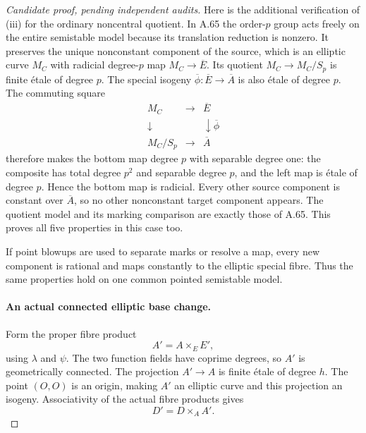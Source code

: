 \begin{proof}[Candidate proof, pending independent audits]
Here is the additional verification of (iii) for the
ordinary noncentral quotient. In A.65 the order-\(p\)
group acts freely on the entire semistable model because
its translation reduction is nonzero. It preserves the
unique nonconstant component of the source, which is an
elliptic curve \(M_C\) with radicial degree-\(p\) map
\(M_C\to\overline E\). Its quotient
\(M_C\to M_C/S_p\) is finite étale of degree \(p\).
The special isogeny
\(\overline\phi:\overline E\to\overline A\) is also
étale of degree \(p\). The commuting square
\[
 \begin{array}{ccc}
 M_C&\longrightarrow&\overline E\\
 \downarrow&&\downarrow\overline\phi\\
 M_C/S_p&\longrightarrow&\overline A
 \end{array}
                                                               \tag{A.66.6}
\]
therefore makes the bottom map degree \(p\) with separable
degree one: the composite has total degree \(p^2\) and
separable degree \(p\), and the left map is étale of degree
\(p\). Hence the bottom map is radicial. Every other source
component is constant over \(\overline A\), so no other
nonconstant target component appears. The quotient model
and its marking comparison are exactly those of A.65.
This proves all five properties in this case too.

If point blowups are used to separate marks or resolve a
map, every new component is rational and maps constantly
to the elliptic special fibre. Thus the same properties
hold on one common pointed semistable model.

\paragraph{An actual connected elliptic base change.}
Form the proper fibre product
\[
                         A'=A\times_E E',
                                                               \tag{A.66.7}
\]
using \(\lambda\) and \(\psi\). The two function fields
have coprime degrees, so \(A'\) is geometrically connected.
The projection \(A'\to A\) is finite étale of degree \(h\).
The point \((O,O)\) is an origin, making \(A'\) an elliptic
curve and this projection an isogeny.
Associativity of the actual fibre products gives
\[
                         D'=D\times_A A'.
                                                               \tag{A.66.8}
\]


\end{proof}
